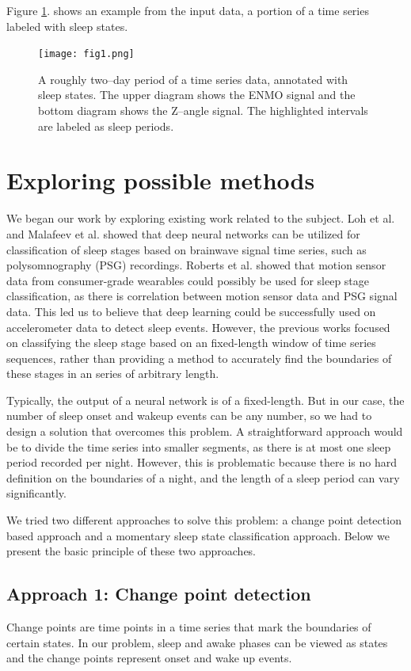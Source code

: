 \documentclass{article}
\begin{document}
Figure \ref{fig:data-example}. shows an example from the input data, a portion of a time series labeled with sleep states.

\begin{figure}
  \label{fig:data-example}
  \centering
  \texttt{[image: fig1.png]}
  \caption{A roughly two–day period of a time series data, annotated with sleep states. The upper diagram shows the ENMO signal and the bottom diagram shows the Z–angle signal. The highlighted intervals are labeled as sleep periods.}
\end{figure}

\section{Exploring possible methods}

We began our work by exploring existing work related to the subject. Loh et al. \cite{sleep1} and Malafeev et al. \cite{sleep3} showed that deep neural networks can be utilized for classification of sleep stages based on brainwave signal time series, such as polysomnography (PSG) recordings. Roberts et al. \cite{sleep2} showed that motion sensor data from consumer-grade wearables could possibly be used for sleep stage classification, as there is correlation between motion sensor data and PSG signal data. This led us to believe that deep learning could be successfully used on accelerometer data to detect sleep events. However, the previous works focused on classifying the sleep stage based on an fixed-length window of time series sequences, rather than providing a method to accurately find the boundaries of these stages in an series of arbitrary length.

Typically, the output of a neural network is of a fixed-length. But in our case, the number of sleep onset and wakeup events can be any number, so we had to design a solution that overcomes this problem. A straightforward approach would be to divide the time series into smaller segments, as there is at most one sleep period recorded per night. However, this is problematic because there is no hard definition on the boundaries of a night, and the length of a sleep period can vary significantly.

We tried two different approaches to solve this problem: a change point detection based approach and a momentary sleep state classification approach. Below we present the basic principle of these two approaches.

\subsection{Approach 1: Change point detection}
Change points are time points in a time series that mark the boundaries of certain states. In our problem, sleep and awake phases can be viewed as states and the change points represent onset and wake up events.
\end{document}
